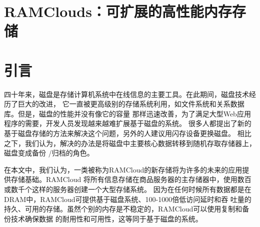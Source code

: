 \documentclass[translation]{zjutreport}
\begin{document}


\frontmatter %

\begingroup %
\let\clearpage\relax %



\titleformat{\chapter}[block]{\sihao\heiti\filcenter\bfseries}{\CJKnumber{\thechapter}}{1ex}{}{} %
\chapter*{RAMClouds：可扩展的高性能内存存储}
{} %





\mainmatter%
\chapter{引言}
四十年来，磁盘是存储计算机系统中在线信息的主要工具。在此期间，磁盘技术经历了巨大的改进，
它一直被更高级别的存储系统利用，如文件系统和关系数据库。但是，磁盘的性能并没有像它的容量
那样迅速改善，为了满足大型Web应用程序的需要，开发人员发现越来越难扩展基于磁盘的系统。
很多人都提出了新的基于磁盘存储的方法来解决这个问题，另外的人建议用​​闪存设备更换磁盘。
相比之下，我们认为，解决的办法是将磁盘中主要核心数据转移到随机存取存储器上，磁盘变成备份
/归档的角色。

在本文中，我们认为，一类被称为RAMCloud的新存储将为许多的未来的应用提供存储基础。RAMCloud
将所有信息存储在商品服务器的主存储器中，使用数百或数千个这样的服务器创建一个大型存储系统。
因为在任何时候所有数据都是在DRAM中，RAMCloud可提供基于磁盘系统、100-1000倍低访问延时和吞
吐量的持久、可用的存储。虽然个别的内存是不稳定的，RAMCloud可以使用复制和备份技术确保数据
的耐用性和可用性，这等同于基于磁盘的系统。
\end{document}
